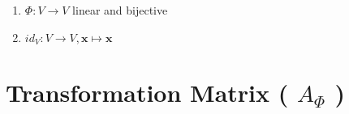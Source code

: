 \begin{enumerate}
    \item
    \begin{definition}[Automorphism]
        $\Phi : V \to V$ linear and bijective
        \hfill \cite{mfml/book/mml/Deisenroth-Faisal-Ong}
    \end{definition}

    \item
    \begin{definition}
        $id_V : V \to V , \bm{x} \mapsto \bm{x}$
        \hfill \cite{mfml/book/mml/Deisenroth-Faisal-Ong}
    \end{definition}
\end{enumerate}



















\section{Transformation Matrix ( $A_\Phi$ )}

